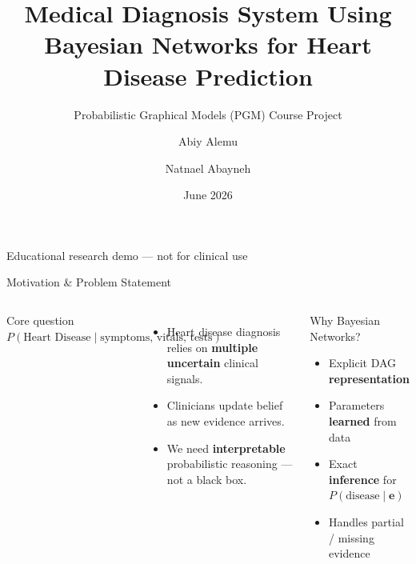 \documentclass[aspectratio=169,11pt]{beamer}
\title[Heart Disease BN]{Medical Diagnosis System Using\\Bayesian Networks for Heart Disease Prediction}
\subtitle{Probabilistic Graphical Models (PGM) Course Project}
\author[Abiy \& Natnael]{Abiy Alemu \and Natnael Abayneh}
\institute[AAU]{Addis Ababa University\\M.Sc.\ in Artificial Intelligence}
\date{June 2026}
\begin{document}
\begin{frame}[plain]
  \titlepage
  \vspace{-0.6cm}
  \begin{center}\small\textcolor{TextGray}{Educational research demo --- not for clinical use}\end{center}
\end{frame}

\begin{frame}{Motivation \& Problem Statement}
  \begin{columns}[T]
    \begin{alertblock}{Core question}
      \Large
      $P(\text{Heart Disease} \mid \text{symptoms, vitals, tests})$
    \end{alertblock}
    \vspace{0.4em}
    \begin{itemize}
      \item Heart disease diagnosis relies on \textbf{multiple uncertain} clinical signals.
      \item Clinicians update belief as new evidence arrives.
      \item We need \textbf{interpretable} probabilistic reasoning --- not a black box.
    \end{itemize}
    \begin{block}{Why Bayesian Networks?}
      \begin{itemize}
        \item Explicit DAG \textbf{representation}
        \item Parameters \textbf{learned} from data
        \item Exact \textbf{inference} for $P(\text{disease}\mid\mathbf{e})$
        \item Handles partial / missing evidence
      \end{itemize}
    \end{block}
  \end{columns}
\end{frame}
\end{document}
